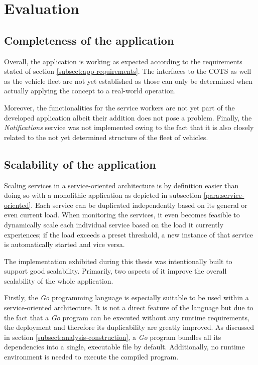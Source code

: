 \documentclass[12pt,a4paper,twoside]{report}
\begin{document}
\chapter{Evaluation} \label{chap:evaluation}



\section{Completeness of the application}

Overall, the application is working as expected according to the requirements
stated of section \ref{subsect:app-requirements}.
The interfaces to the COTS as well as the vehicle fleet are not yet established
as those can only be determined when actually applying the concept to a real-world
operation.

Moreover, the functionalities for the service workers are not yet part
of the developed application albeit their addition does not pose a problem.
Finally, the \textit{Notifications} service was not implemented owing to the
fact that it is also closely related to the not yet determined structure of the
fleet of vehicles.


\section{Scalability of the application}

Scaling services in a service-oriented architecture is by definition easier
than doing so with a monolithic application as depicted in subsection
\ref{para:service-oriented}. Each service can be duplicated independently
based on its general or even current load. When monitoring the services,
it even becomes feasible to dynamically scale each individual service based
on the load it currently experiences; if the load exceeds a preset threshold,
a new instance of that service is automatically started and vice versa.

The implementation exhibited during this thesis was intentionally built to
support good scalability. Primarily, two aspects of it improve the
overall scalability of the whole application.

Firstly, the \textit{Go} programming language is especially suitable to be
used within a service-oriented architecture. It is not a direct feature of
the language but due to the fact that a \textit{Go} program can be executed
without any runtime requirements, the deployment and therefore its
duplicability are greatly improved. As discussed in section
\ref{subsect:analysis-construction}, a \textit{Go} program bundles all its
dependencies into a single, executable file by default.
Additionally, no runtime environment is needed to execute the compiled program.
\end{document}

